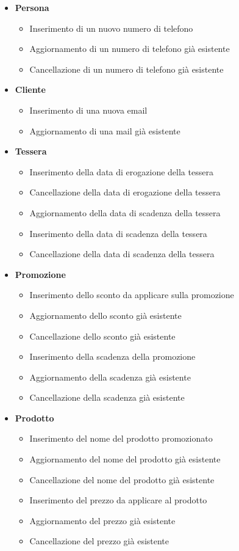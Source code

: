 \documentclass[12pt]{report}
\begin{document}
\begin{itemize}
\item \textbf{Persona}
	\begin{itemize}
	\item Inserimento di un nuovo numero di telefono
	\item Aggiornamento di un numero di telefono già esistente
	\item Cancellazione di un numero di telefono già esistente
	\end{itemize}
\item \textbf{Cliente}
	\begin{itemize}
	\item Inserimento di una nuova email
	\item Aggiornamento di una mail già esistente
	\end{itemize}
\item \textbf{Tessera}
	\begin{itemize}
	\item Inserimento della data di erogazione della tessera
	\item Cancellazione della data di erogazione della tessera
	\item Aggiornamento della data di scadenza della tessera	
	\item Inserimento della data di scadenza della tessera
	\item Cancellazione della data di scadenza della tessera
	\end{itemize}
\item \textbf{Promozione}
	\begin{itemize}
	\item Inserimento dello sconto da applicare sulla promozione
	\item Aggiornamento dello sconto già esistente
	\item Cancellazione dello sconto già esistente
	\item Inserimento della scadenza della promozione
	\item Aggiornamento della scadenza già esistente
	\item Cancellazione della scadenza già esistente
	\end{itemize}
	\item \textbf{Prodotto}
	\begin{itemize}
	\item Inserimento del nome del prodotto promozionato 
	\item Aggiornamento del nome del prodotto già esistente
	\item Cancellazione del nome del prodotto già esistente
	\item Inserimento del prezzo da applicare al prodotto
	\item Aggiornamento del prezzo già esistente
	\item Cancellazione del prezzo già esistente


\end{itemize}
\end{itemize}
\end{document}
